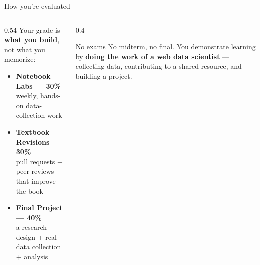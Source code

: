\documentclass[9pt,aspectratio=169]{beamer}
\begin{document}
\begin{frame}{How you're evaluated}
    \begin{columns}[T]
        \begin{column}{0.54\textwidth}
            Your grade is \textbf{what you build}, not what you memorize:
            \vspace{0.5em}
            \begin{itemize}
                \item \textcolor{tab-blue}{\textbf{Notebook Labs --- 30\%}}\\ {\small weekly, hands-on data-collection work}
                \item \textcolor{tab-green}{\textbf{Textbook Revisions --- 30\%}}\\ {\small pull requests + peer reviews that improve the book}
                \item \textcolor{tab-orange}{\textbf{Final Project --- 40\%}}\\ {\small a research design + real data collection + analysis}
            \end{itemize}
        \end{column}
        \begin{column}{0.4\textwidth}
            \begin{block}{No exams}
                \footnotesize No midterm, no final. You demonstrate learning by \textbf{doing the work of a web data scientist} --- collecting data, contributing to a shared resource, and building a project.
            \end{block}
        \end{column}
    \end{columns}
\end{frame}
\end{document}
